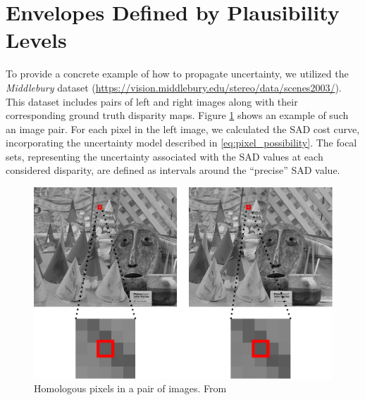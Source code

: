 \section{Envelopes Defined by Plausibility Levels}
To provide a concrete example of how to propagate uncertainty, we utilized the \textit{Middlebury} dataset (\url{https://vision.middlebury.edu/stereo/data/scenes2003/}). This dataset includes pairs of left and right images along with their corresponding ground truth disparity maps. Figure \ref{fig:Cones} shows an example of such an image pair.
For each pixel in the left image, we calculated the SAD cost curve, incorporating the uncertainty model described in \eqref{eq:pixel_possibility}. The focal sets, representing the uncertainty associated with the SAD values at each considered disparity, are defined as intervals around the ``precise'' SAD value.

\begin{figure}[ht]
  \centering
  \includegraphics[width=0.8\linewidth]{Images/Chap_4/Cones.png}
  \caption{Homologous pixels in a pair of images. From \cite{malinowski_uncertainty_2024}}\label{fig:Cones}
\end{figure}

